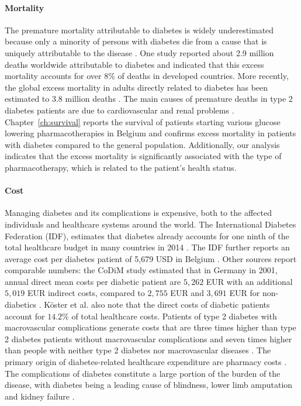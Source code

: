 \paragraph{Mortality} 
The premature mortality attributable to diabetes is widely underestimated because only a minority of persons with diabetes die from a cause that is uniquely attributable to the disease \citep{beulens2010global}. One study reported about 2.9 million deaths worldwide attributable to diabetes \citep{roglic2005burden} and indicated that this excess mortality accounts for over $8\%$ of deaths in developed countries. More recently, the global excess mortality in adults directly related to diabetes has been estimated to 3.8 million deaths \citep{beulens2010global}. The main causes of premature deaths in type 2 diabetes patients are due to cardiovascular and renal problems \citep{morrish2001mortality, beulens2010global}. 
Chapter~\ref{ch:survival} reports the survival of patients starting various glucose lowering pharmacotherapies in Belgium and confirms excess mortality in patients with diabetes compared to the general population. Additionally, our analysis indicates that the excess mortality is significantly associated with the type of pharmacotherapy, which is related to the patient's health status.


\paragraph{Cost} Managing diabetes and its complications is expensive, both to the affected individuals and healthcare systems around the world.  The International Diabetes Federation (IDF), estimates that diabetes already accounts for one ninth of the total healthcare budget in many countries in 2014 \citep{IDFfacts}. The IDF further reports an average cost per diabetes patient of 5,679 USD in Belgium \citep{IDFatlas}. Other sources report comparable numbers: the CoDiM study estimated that in Germany in 2001, annual direct mean costs per diabetic patient are $5,262$ EUR with an additional $5,019$ EUR indirect costs, compared to $2,755$ EUR and $3,691$ EUR for non-diabetics \citep{koster2006cost}. K\"oster et al. \citep{koster2006cost} also note that the direct costs of diabetic patients account for $14.2\%$ of total healthcare costs. Patients of type 2 diabetes with macrovascular complications generate costs that are three times higher than type 2 diabetes patients without macrovascular complications and seven times higher than people with neither type 2 diabetes nor macrovascular diseases \citep{beulens2010global}. The primary origin of diabetes-related healthcare expenditure are pharmacy costs \citep{nichols2002impact, gandra2006total}. The complications of diabetes constitute a large portion of the burden of the disease, with diabetes being a leading cause of blindness, lower limb amputation and kidney failure \citep{beulens2010global}. 


